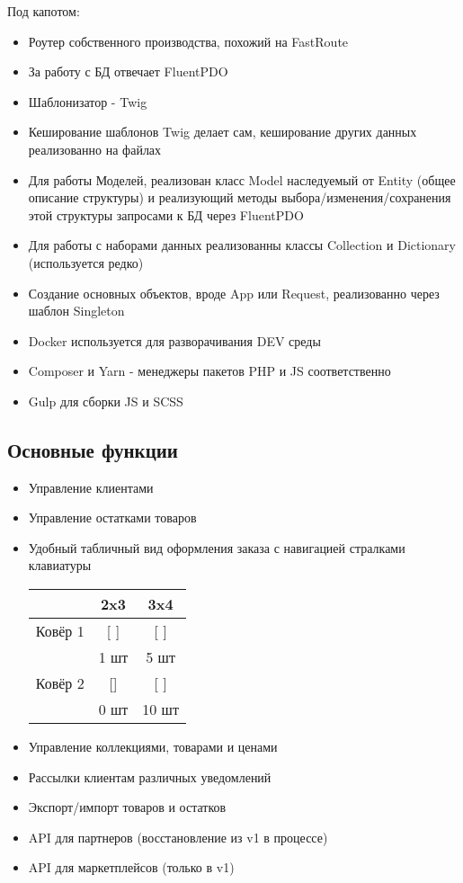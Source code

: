 \documentclass[10pt]{tpl/developercv} %
\begin{document}
Под капотом:
\begin{itemize}
  \item Роутер собственного производства, похожий на FastRoute
  \item За работу с БД отвечает FluentPDO
  \item Шаблонизатор - Twig
  \item Кеширование шаблонов Twig делает сам, кеширование других данных реализованно на файлах
  \item Для работы Моделей, реализован класс Model наследуемый от Entity (общее описание структуры) и реализующий методы выбора/изменения/сохранения этой структуры запросами к БД через FluentPDO
  \item Для работы с наборами данных реализованны классы Collection и Dictionary (используется редко)
  \item Создание основных объектов, вроде App или Request, реализованно через шаблон Singleton
  \item Docker используется для разворачивания DEV среды
  \item Composer и Yarn - менеджеры пакетов PHP и JS соответственно
  \item Gulp для сборки JS и SCSS
\end{itemize}

\subsection{Основные функции}
\begin{itemize}
  \item Управление клиентами
  \item Управление остатками товаров
  \item {
    Удобный табличный вид оформления заказа с навигацией стралками клавиатуры
    \begin{center}
      \begin{tabular}{ |c|c|c| }
        \hline
        & 2x3 & 3x4 \\
        \hline
         Ковёр 1 & [  ] & [  ] \\
                & 1 шт & 5 шт \\
        \hline
         Ковёр 2 & [] & [  ] \\
                & 0 шт & 10 шт \\
        \hline
      \end{tabular}
    \end{center}
  }
  \item Управление коллекциями, товарами и ценами
  \item Рассылки клиентам различных уведомлений
  \item Экспорт/импорт товаров и остатков
  \item API для партнеров (восстановление из v1 в процессе)
  \item API для маркетплейсов (только в v1)
\end{itemize}
\end{document}
